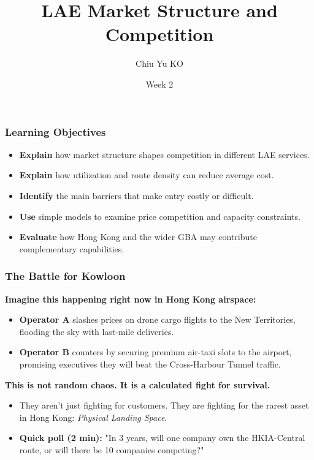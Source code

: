 \documentclass{beamer}
\begin{document}
\begin{frame}
    \title{LAE Market Structure and Competition}
    \author{Chiu Yu KO}
    \date{Week 2}
  \titlepage
\end{frame}

\begin{frame}[t]
  \frametitle{Learning Objectives}

  \begin{itemize}
    \item \textbf{Explain} how market structure shapes competition in different LAE services.
    \item \textbf{Explain} how utilization and route density can reduce average cost.
    \item \textbf{Identify} the main barriers that make entry costly or difficult.
    \item \textbf{Use} simple models to examine price competition and capacity constraints.
    \item \textbf{Evaluate} how Hong Kong and the wider GBA may contribute complementary capabilities.
  \end{itemize}
\end{frame}

\begin{frame}[t]
  \frametitle{The Battle for Kowloon}
  
  \textbf{Imagine this happening right now in Hong Kong airspace:}
  \begin{itemize}
      \item \textbf{Operator A} slashes prices on drone cargo flights to the New Territories, flooding the sky with last-mile deliveries.
      \item \textbf{Operator B} counters by securing premium air-taxi slots to the airport, promising executives they will beat the Cross-Harbour Tunnel traffic.
  \end{itemize}

  \vspace{0.3cm}
  \textbf{This is not random chaos. It is a calculated fight for survival.}
  \begin{itemize}
    \item They aren't just fighting for customers. They are fighting for the rarest asset in Hong Kong: \textit{Physical Landing Space}.
    \item \textbf{Quick poll (2 min):} "In 3 years, will one company own the HKIA-Central route, or will there be 10 companies competing?"
  \end{itemize}
\end{frame}
\end{document}

